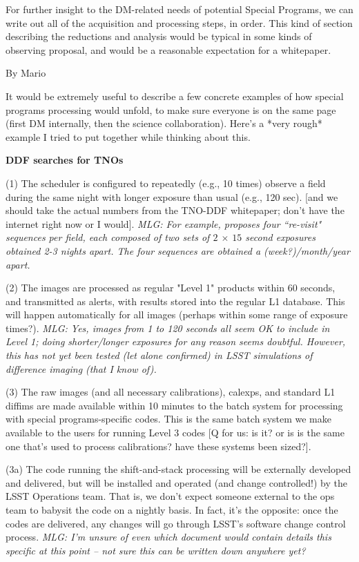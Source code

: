 \documentclass[DM,lsstdraft,toc]{lsstdoc}
\begin{document}
For further insight to the DM-related needs of potential Special Programs, we can write out all of the acquisition and processing steps, in order. This kind of section describing the reductions and analysis would be typical in some kinds of observing proposal, and would be a reasonable expectation for a whitepaper.


\noindent By Mario 

It would be extremely useful to describe a few concrete examples of how special programs processing would unfold, to make sure everyone is on the same page (first DM internally, then the science collaboration). Here's a *very rough* example I tried to put together while thinking about this.

\noindent \textbf{DDF searches for TNOs}

(1) The scheduler is configured to repeatedly (e.g., 10 times) observe a field during the same night with longer exposure than usual (e.g., 120 sec). [and we should take the actual numbers from the TNO-DDF whitepaper; don't have the internet right now or I would]. {\it MLG: For example, \citep{BeckerWP} proposes four ``re-visit" sequences per field, each composed of two sets of $2$ $\times$ $15$ second exposures obtained 2-3 nights apart. The four sequences are obtained a (week?)/month/year apart.}

(2) The images are processed as regular "Level 1" products within 60 seconds, and transmitted as alerts, with results stored into the regular L1 database. This will happen automatically for all images (perhaps within some range of exposure times?). {\it MLG: Yes, images from 1 to 120 seconds all seem OK to include in Level 1; doing shorter/longer exposures for any reason seems doubtful. However, this has not yet been tested (let alone confirmed) in LSST simulations of difference imaging (that I know of).}

(3) The raw images (and all necessary calibrations), calexps, and standard L1 diffims are made available within 10 minutes to the batch system for processing with special programs-specific codes. This is the same batch system we make available to the users for running Level 3 codes [Q for us: is it? or is is the same one that's used to process calibrations? have these systems been sized?].

(3a) The code running the shift-and-stack processing will be externally developed and delivered, but will be installed and operated (and change controlled!) by the LSST Operations team. That is, we don't expect someone external to the ops team to babysit the code on a nightly basis. In fact, it's the opposite: once the codes are delivered, any changes will go through LSST's software change control process. {\it MLG: I'm unsure of even which document would contain details this specific at this point -- not sure this can be written down anywhere yet?}
\end{document}
